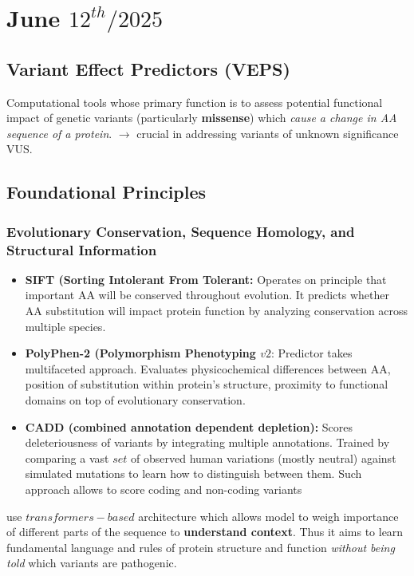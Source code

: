 \documentclass[../main.tex]{subfiles}
\begin{document}
\chapter{June $12^{th}/2025$}
\label{ch:tufte-book}

\section{Variant Effect Predictors (VEPS)}

Computational tools whose primary function is to assess potential functional impact of genetic variants (particularly \textbf{missense}) which \textit{cause a change in AA sequence of a protein}. $\rightarrow$ crucial in addressing variants of unknown significance VUS.

\hrulefill

\section*{Foundational Principles}
\subsection*{Evolutionary Conservation, Sequence Homology, and Structural Information}

\begin{itemize}
    \item \textbf{SIFT (Sorting Intolerant From Tolerant:} Operates on principle that important AA will be conserved throughout evolution. It predicts whether AA substitution will impact protein function by analyzing conservation across multiple species. 
    \item \textbf{PolyPhen-2 (Polymorphism Phenotyping $v2$}: Predictor takes multifaceted approach. Evaluates physicochemical differences between AA, position of substitution within protein's structure, proximity to functional domains on top of evolutionary conservation.
    \item \textbf{CADD (combined annotation dependent depletion):} Scores deleteriousness of variants by integrating multiple annotations. Trained by comparing a vast $set$ of observed human variations (mostly neutral) against simulated mutations to learn how to distinguish between them. Such approach allows to score coding and non-coding variants
\end{itemize}

 use $transformers-based$ architecture which allows model to weigh importance of different parts of the sequence to \textbf{understand context}. Thus it aims to learn fundamental language and rules of protein structure and function \textit{without being told} which variants are pathogenic.
\end{document}
